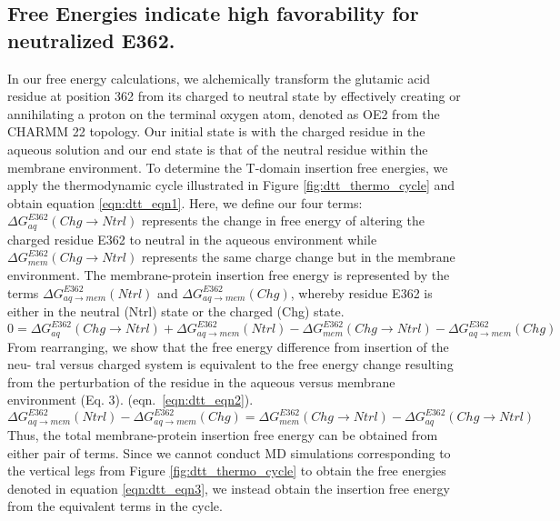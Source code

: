 \subsection{Free Energies indicate high favorability for neutralized E362.}
In our free energy calculations, we alchemically transform the glutamic acid residue at position 362 from its charged to neutral state by effectively creating or annihilating a proton on the terminal oxygen atom, denoted as OE2 from the CHARMM 22 topology.
Our initial state is with the charged residue in the aqueous solution and our end state is that of the neutral residue within the membrane environment. 
To determine the T-domain insertion free energies, we apply the thermodynamic cycle illustrated in Figure \ref{fig:dtt_thermo_cycle} and obtain equation \ref{eqn:dtt_eqn1}.
Here, we define our four terms: $\Delta G_{aq}^{E362}(Chg\rightarrow Ntrl)$ represents the change in free energy of altering the charged residue E362 to neutral in the aqueous environment while $\Delta G_{mem}^{E362}(Chg\rightarrow Ntrl)$ represents the same charge change but in the membrane environment.
The membrane-protein insertion free energy is represented by the terms $\Delta G_{aq\rightarrow mem}^{E362}(Ntrl)$ and $\Delta G_{aq\rightarrow mem}^{E362}(Chg)$, whereby residue E362 is either in the neutral (Ntrl) state or the charged (Chg) state.
\begin{equation}
  0  = \Delta G_{aq}^{E362}(Chg\rightarrow Ntrl) + \Delta G_{aq\rightarrow mem}^{E362}(Ntrl) - \Delta G_{mem}^{E362}(Chg\rightarrow Ntrl) - \Delta G_{aq\rightarrow mem}^{E362}(Chg)
  \label{eqn:dtt_eqn1}
\end{equation}
From rearranging, we show that the free energy difference from insertion of the neu- tral versus charged system is equivalent to the free energy change resulting from the perturbation of the residue in the aqueous versus membrane environment (Eq. 3).  (eqn.~\ref{eqn:dtt_eqn2}).
\begin{equation}
  \Delta G_{aq\rightarrow mem}^{E362}(Ntrl) - \Delta G_{aq\rightarrow mem}^{E362}(Chg)  =  \Delta G_{mem}^{E362}(Chg\rightarrow Ntrl) - \Delta G_{aq}^{E362}(Chg\rightarrow Ntrl)
  \label{eqn:dtt_eqn2}
\end{equation}
Thus, the total membrane-protein insertion free energy can be obtained from either pair of terms.
Since we cannot conduct MD simulations corresponding to the vertical legs from Figure \ref{fig:dtt_thermo_cycle} to obtain the free energies denoted in equation \ref{eqn:dtt_eqn3}, we instead obtain the insertion free energy from the equivalent terms in the cycle.
